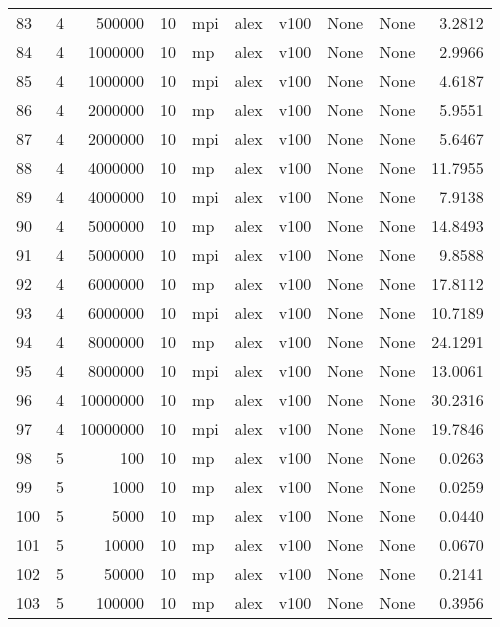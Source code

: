 \begin{tabular}{lrrrlllllr}
83  &   4 &    500000 &      10 &  mpi &  alex &  v100 &  None &  None &   3.2812 \\
84  &   4 &   1000000 &      10 &   mp &  alex &  v100 &  None &  None &   2.9966 \\
85  &   4 &   1000000 &      10 &  mpi &  alex &  v100 &  None &  None &   4.6187 \\
86  &   4 &   2000000 &      10 &   mp &  alex &  v100 &  None &  None &   5.9551 \\
87  &   4 &   2000000 &      10 &  mpi &  alex &  v100 &  None &  None &   5.6467 \\
88  &   4 &   4000000 &      10 &   mp &  alex &  v100 &  None &  None &  11.7955 \\
89  &   4 &   4000000 &      10 &  mpi &  alex &  v100 &  None &  None &   7.9138 \\
90  &   4 &   5000000 &      10 &   mp &  alex &  v100 &  None &  None &  14.8493 \\
91  &   4 &   5000000 &      10 &  mpi &  alex &  v100 &  None &  None &   9.8588 \\
92  &   4 &   6000000 &      10 &   mp &  alex &  v100 &  None &  None &  17.8112 \\
93  &   4 &   6000000 &      10 &  mpi &  alex &  v100 &  None &  None &  10.7189 \\
94  &   4 &   8000000 &      10 &   mp &  alex &  v100 &  None &  None &  24.1291 \\
95  &   4 &   8000000 &      10 &  mpi &  alex &  v100 &  None &  None &  13.0061 \\
96  &   4 &  10000000 &      10 &   mp &  alex &  v100 &  None &  None &  30.2316 \\
97  &   4 &  10000000 &      10 &  mpi &  alex &  v100 &  None &  None &  19.7846 \\
98  &   5 &       100 &      10 &   mp &  alex &  v100 &  None &  None &   0.0263 \\
99  &   5 &      1000 &      10 &   mp &  alex &  v100 &  None &  None &   0.0259 \\
100 &   5 &      5000 &      10 &   mp &  alex &  v100 &  None &  None &   0.0440 \\
101 &   5 &     10000 &      10 &   mp &  alex &  v100 &  None &  None &   0.0670 \\
102 &   5 &     50000 &      10 &   mp &  alex &  v100 &  None &  None &   0.2141 \\
103 &   5 &    100000 &      10 &   mp &  alex &  v100 &  None &  None &   0.3956 \\

\end{tabular}
